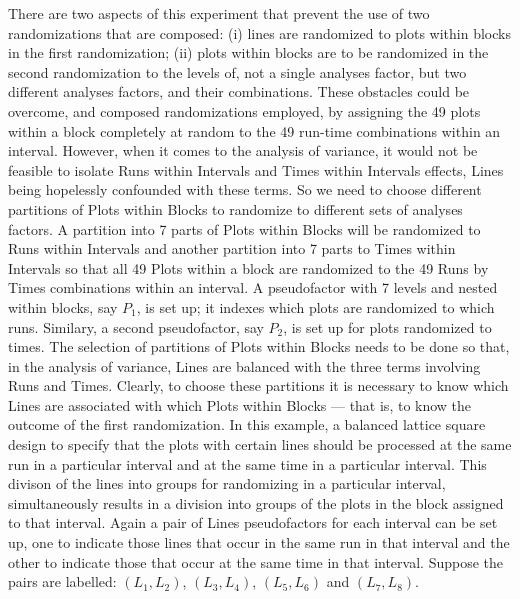 There are two aspects of this experiment that prevent the use of 
two randomizations that are composed:  (i) lines are randomized to plots 
within blocks in the first randomization;  (ii) plots within blocks 
are to be randomized in the second randomization 
to the levels of, not a single analyses factor,
but two different analyses factors, and their combinations.
These obstacles could be overcome, and composed randomizations employed, 
by assigning the 49 plots within a block completely at random to the 
49 run-time combinations within an interval. However, when it comes to 
the analysis of variance, it would not be feasible to isolate 
Runs within Intervals and Times within Intervals effects, 
Lines being hopelessly confounded with these terms. So we need to 
choose different partitions of Plots within Blocks to randomize to 
different sets of analyses factors. A partition into 7 parts of 
Plots within Blocks will be randomized to Runs within Intervals and 
another partition into 7 parts to Times within Intervals 
so that all 49 Plots within a block are randomized 
to the 49 Runs by Times combinations within an interval. A pseudofactor with
7 levels and nested within blocks, say $P_1$, is set up; it indexes which 
plots are randomized to which runs. Similary, a second pseudofactor, 
say $P_2$, is set up for plots randomized to times. 
The selection of partitions of Plots within Blocks needs to be 
done so that, in the analysis of variance, Lines are balanced with the 
three terms involving Runs and Times. Clearly, to choose these 
partitions it is necessary to know which Lines are associated with 
which Plots within Blocks --- that is, to know the outcome of the 
first randomization. In this example, a balanced lattice square design to 
specify that the plots with certain lines should be processed at the 
same run in a particular interval and at the same time in a particular 
interval. This divison of the lines into groups for randomizing in a 
particular interval, simultaneously results in a division into groups of 
the plots in the block assigned to that interval. Again a pair of 
Lines pseudofactors for each interval can be set up, one to indicate those 
lines that occur in the same run in that interval and the other to 
indicate those that occur at the same time in that interval. Suppose the pairs
are labelled: $(L_1,L_2)$, $(L_3,L_4)$, $(L_5,L_6)$ and $(L_7,L_8)$. 


